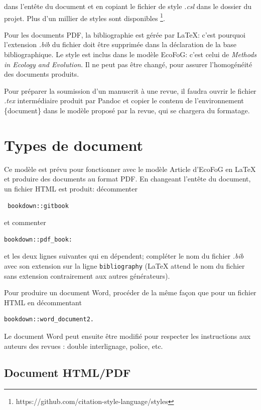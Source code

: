 \documentclass[fleqn,10pt]{ArtEcoFoG} %
\begin{document}
dans l'entête du document et en copiant le fichier de style \emph{.csl}
dans le dossier du projet. Plus d'un millier de styles sont disponibles
\footnote{https://github.com/citation-style-language/styles}.

Pour les documents PDF, la bibliographie est gérée par \LaTeX: c'est
pourquoi l'extension \emph{.bib} du fichier doit être supprimée dans la
déclaration de la base bibliographique. Le style est inclus dans le
modèle EcoFoG: c'est celui de \emph{Methods in Ecology and Evolution}.
Il ne peut pas être changé, pour assurer l'homogénéité des documents
produits.

Pour préparer la soumission d'un manuscrit à une revue, il faudra ouvrir
le fichier \emph{.tex} intermédiaire produit par Pandoc et copier le
contenu de l'environnement \{document\} dans le modèle proposé par la
revue, qui se chargera du formatage.

\section{Types de document}\label{types-de-document}

Ce modèle est prévu pour fonctionner avec le modèle Article d'EcoFoG en
LaTeX et produire des documents au format PDF. En changeant l'entête du
document, un fichier HTML est produit: décommenter

\begin{verbatim}
 bookdown::gitbook
\end{verbatim}

et commenter

\begin{verbatim}
bookdown::pdf_book:
\end{verbatim}

et les deux lignes suivantes qui en dépendent; compléter le nom du
fichier \emph{.bib} avec son extension sur la ligne
\texttt{bibliography} (LaTeX attend le nom du fichier sans extension
contrairement aux autres générateurs).

Pour produire un document Word, procéder de la même façon que pour un
fichier HTML en décommentant

\begin{verbatim}
bookdown::word_document2.
\end{verbatim}

Le document Word peut ensuite être modifié pour respecter les
instructions aux auteurs des revues : double interlignage, police, etc.

\subsection{Document HTML/PDF}\label{document-htmlpdf}
\end{document}
